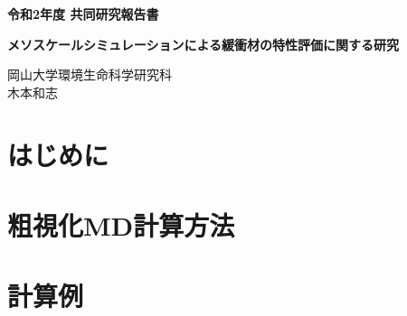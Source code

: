 ﻿\documentclass[11pt,a4j]{jarticle}
\newlength{\minitwocolumn}
\begin{document}
\newcommand{\fat}[1]{\mbox{\boldmath $#1$}}
\newcommand{\D}{\partial}
\newcommand{\w}{\omega}
\newcommand{\ga}{\alpha}
\newcommand{\gb}{\beta}
\newcommand{\gx}{\xi}
\newcommand{\gz}{\zeta}
\newcommand{\vhat}[1]{\hat{\fat{#1}}}
\newcommand{\spc}{\vspace{0.7\baselineskip}}
\newcommand{\halfspc}{\vspace{0.3\baselineskip}}

\newcommand{\twofig}[2]
 {
   \begin{figure}[h]
     \begin{minipage}[t]{\minitwocolumn}
         \begin{center}   #1
         \end{center}
     \end{minipage}
         \hspace{\columnsep}
     \begin{minipage}[t]{\minitwocolumn}
         \begin{center} #2
         \end{center}
     \end{minipage}
   \end{figure}
 }
\begin{center}
{\Large \bf 令和2年度 共同研究報告書}
\end{center}
\vspace{2mm}
\begin{center}
{\LARGE \bf 
メソスケールシミュレーションによる緩衝材の特性評価に関する研究} 
\end{center}
\begin{center}
岡山大学環境生命科学研究科\\
木本和志
\end{center}
\vspace{10mm}
\section{はじめに}

\section{粗視化MD計算方法}
%
\section{計算例}
%
\end{document}
